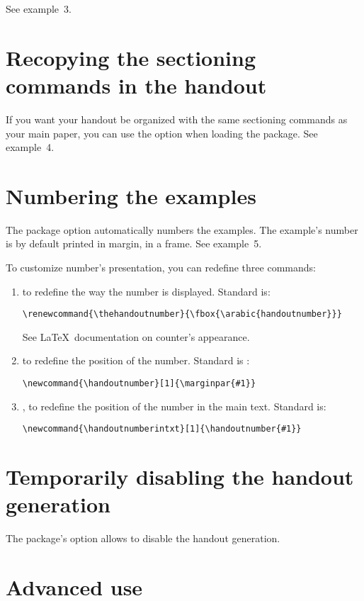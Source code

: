 \documentclass{ltxdockit}[2011/03/25]
\begin{document}
See example~3.

\section{Recopying the sectioning commands in the handout}

If you want your handout be organized with the same sectioning commands as your main paper, you can use the option  when loading the package. See example~4.

\section{Numbering the examples}

The package option  automatically numbers the examples. The example's number is by default printed in margin, in a frame. See example~5. 

To customize number's presentation, you can redefine three commands:
\begin{enumerate}  
  \item {} to redefine the way the number is displayed. Standard is:
\begin{verbatim}
\renewcommand{\thehandoutnumber}{\fbox{\arabic{handoutnumber}}}
\end{verbatim}  
See \LaTeX\ documentation on counter's appearance. 
  \item {} to redefine the position of the number. Standard is :
\begin{verbatim}
\newcommand{\handoutnumber}[1]{\marginpar{#1}}
\end{verbatim}
  \item {}, to redefine the position of the number in the main text. Standard is:
\begin{verbatim}
\newcommand{\handoutnumberintxt}[1]{\handoutnumber{#1}}
\end{verbatim}
\end{enumerate}

\section{Temporarily disabling the handout generation}

The package's option  allows to disable the handout generation. 

\section{Advanced use}
\end{document}
